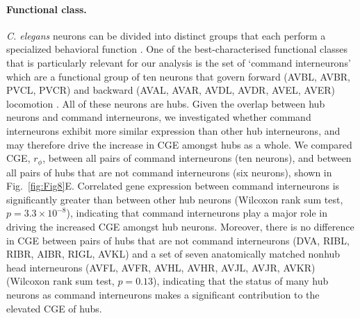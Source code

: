 \documentclass[10pt,letterpaper]{article}
\begin{document}
{\paragraph{Functional class.}
\emph{C. elegans} neurons can be divided into distinct groups that each perform a specialized behavioral function \cite{Hobert2003}.
One of the best-characterised functional classes that is particularly relevant for our analysis is the set of `command interneurons' which are a functional group of ten neurons that govern forward (AVBL, AVBR, PVCL, PVCR) and backward (AVAL, AVAR, AVDL, AVDR, AVEL, AVER) locomotion \cite{Rakowski2013}.
All of these neurons are hubs.
Given the overlap between hub neurons and command interneurons, we investigated whether command interneurons exhibit more similar expression than other hub interneurons, and may therefore drive the increase in CGE amongst hubs as a whole.
We compared CGE, $r_\phi$, between all pairs of command interneurons (ten neurons), and between all pairs of hubs that are not command interneurons (six neurons), shown in Fig.~\ref{fig:Fig8}E.
Correlated gene expression between command interneurons is significantly greater than between other hub neurons (Wilcoxon rank sum test, $p = 3.3 \times 10^{-8}$), indicating that command interneurons play a major role in driving the increased CGE amongst hub neurons.
Moreover, there is no difference in CGE between pairs of hubs that are not command interneurons (DVA, RIBL, RIBR, AIBR, RIGL, AVKL) and a set of seven anatomically matched nonhub head interneurons (AVFL, AVFR, AVHL, AVHR, AVJL, AVJR, AVKR) (Wilcoxon rank sum test, $p = 0.13$), indicating that the status of many hub neurons as command interneurons makes a significant contribution to the elevated CGE of hubs.



}
\end{document}
